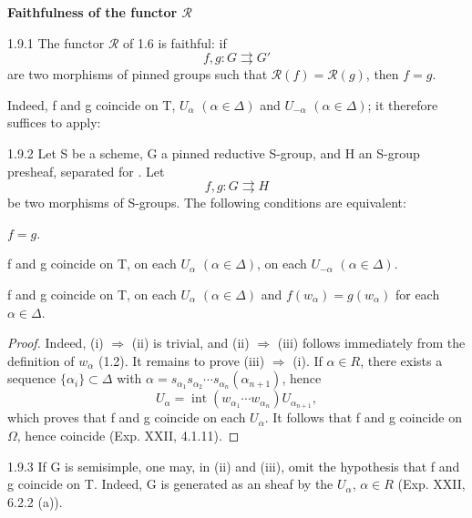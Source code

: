 \textbf{Faithfulness of the functor $\mathscr R$}
\begin{proposition}{1.9.1}\label{XXIII.1.9.1}
The functor $\mathscr R$ of 1.6 is faithful: if
\[
f,g:G\rightrightarrows G'
\]
are two morphisms of pinned groups such that $\mathscr R(f)=\mathscr R(g)$, then $f=g$.
\end{proposition}
Indeed, f and g coincide on T, $U_\alpha$ $(\alpha\in\Delta)$ and $U_{-\alpha}$ $(\alpha\in\Delta)$; it therefore suffices to apply:
\begin{lemma}{1.9.2}\label{XXIII.1.9.2}
Let S be a scheme, G a pinned reductive S-group, and H an S-group presheaf, separated for \fppf. Let
\[
f,g:G\rightrightarrows H
\]
be two morphisms of S-groups. The following conditions are equivalent:
\begin{enumeratei}
\item $f=g$.
\item f and g coincide on T, on each $U_\alpha$ $(\alpha\in\Delta)$, on each $U_{-\alpha}$ $(\alpha\in\Delta)$.
\item f and g coincide on T, on each $U_\alpha$ $(\alpha\in\Delta)$ and $f(w_\alpha)=g(w_\alpha)$ for each $\alpha\in\Delta$.
\end{enumeratei}
\end{lemma}
\begin{proof}
Indeed, (i) $\Rightarrow$ (ii) is trivial, and (ii) $\Rightarrow$ (iii) follows immediately from the definition of $w_\alpha$ (1.2). It remains to prove (iii) $\Rightarrow$ (i). If $\alpha\in R$, there exists a sequence $\{\alpha_i\}\subset\Delta$ with $\alpha=s_{\alpha_1}s_{\alpha_2}\cdots s_{\alpha_n}(\alpha_{n+1})$, hence
\[
U_\alpha=\operatorname{int}(w_{\alpha_1}\cdots w_{\alpha_n})U_{\alpha_{n+1}},
\]
which proves that f and g coincide on each $U_\alpha$. It follows that f and g coincide on $\Omega$, hence coincide (Exp. XXII, 4.1.11).
\end{proof}
\begin{remark}{1.9.3}\label{XXIII.1.9.3}
If G is semisimple, one may, in (ii) and (iii), omit the hypothesis that f and g coincide on T. Indeed, G is generated as an \fppf sheaf by the $U_\alpha$, $\alpha\in R$ (Exp. XXII, 6.2.2 (a)).
\end{remark}

